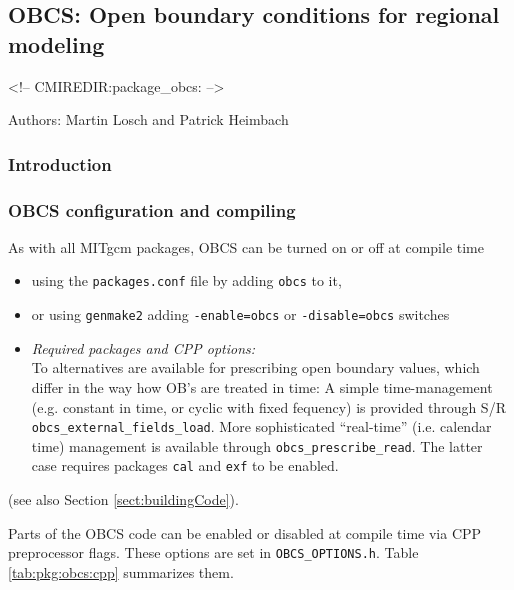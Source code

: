 \subsection{OBCS: Open boundary conditions for regional modeling}

\label{sec:pkg:obcs}
\begin{rawhtml}
<!-- CMIREDIR:package_obcs: -->
\end{rawhtml}

Authors: Martin Losch and Patrick Heimbach

\subsubsection{Introduction
\label{sec:pkg:obcs:intro}}




\subsubsection{OBCS configuration and compiling
\label{sec:pkg:kpp:comp}}

As with all MITgcm packages, OBCS can be turned on or off 
at compile time
%
\begin{itemize}
%
\item
using the \texttt{packages.conf} file by adding \texttt{obcs} to it,
%
\item
or using \texttt{genmake2} adding
\texttt{-enable=obcs} or \texttt{-disable=obcs} switches
%
\item
\textit{Required packages and CPP options:} \\
%
To alternatives are available for prescribing open boundary values,
which differ in the way how OB's are treated in time:
A simple time-management (e.g. constant in time, or cyclic with
fixed fequency) is provided through 
S/R \texttt{obcs\_external\_fields\_load}.
More sophisticated ``real-time'' (i.e. calendar time) management is
available through \texttt{obcs\_prescribe\_read}. 
The latter case requires
packages \texttt{cal} and \texttt{exf} to be enabled.
%
\end{itemize}
(see also Section \ref{sect:buildingCode}).

Parts of the OBCS code can be enabled or disabled at compile time
via CPP preprocessor flags. These options are set in
\texttt{OBCS\_OPTIONS.h}. Table \ref{tab:pkg:obcs:cpp} summarizes them.


